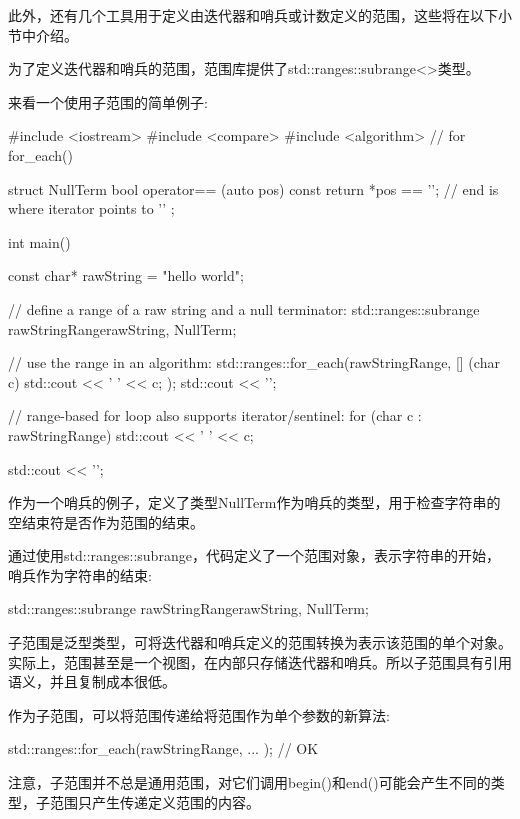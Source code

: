 此外，还有几个工具用于定义由迭代器和哨兵或计数定义的范围，这些将在以下小节中介绍。


为了定义迭代器和哨兵的范围，范围库提供了std::ranges::subrange<>类型。

来看一个使用子范围的简单例子:


\begin{cpp}
#include <iostream>
#include <compare>
#include <algorithm> // for for_each()

struct NullTerm {
	bool operator== (auto pos) const {
		return *pos == '\0'; // end is where iterator points to ’\0’
	}
};

int main()
{
	const char* rawString = "hello world";
	
	// define a range of a raw string and a null terminator:
	std::ranges::subrange rawStringRange{rawString, NullTerm{}};
	
	// use the range in an algorithm:
	std::ranges::for_each(rawStringRange,
	[] (char c) {
		std::cout << ' ' << c;
	});
	std::cout << '\n';
	
	// range-based for loop also supports iterator/sentinel:
	for (char c : rawStringRange) {
		std::cout << ' ' << c;
	}
	
	std::cout << '\n';
}
\end{cpp}

作为一个哨兵的例子，定义了类型NullTerm作为哨兵的类型，用于检查字符串的空结束符是否作为范围的结束。

通过使用std::ranges::subrange，代码定义了一个范围对象，表示字符串的开始，哨兵作为字符串的结束:

\begin{cpp}
std::ranges::subrange rawStringRange{rawString, NullTerm{}};
\end{cpp}

子范围是泛型类型，可将迭代器和哨兵定义的范围转换为表示该范围的单个对象。实际上，范围甚至是一个视图，在内部只存储迭代器和哨兵。所以子范围具有引用语义，并且复制成本很低。

作为子范围，可以将范围传递给将范围作为单个参数的新算法:

\begin{cpp}
std::ranges::for_each(rawStringRange, ... ); // OK
\end{cpp}

注意，子范围并不总是通用范围，对它们调用begin()和end()可能会产生不同的类型，子范围只产生传递定义范围的内容。


